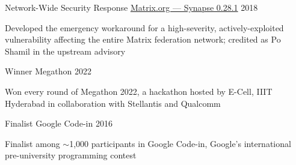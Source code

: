 
\begin{cventries}
  \cventry
    {Network-Wide Security Response} %
    {\href{https://matrix.org/blog/2018/05/01/security-update-synapse-0-28-1/}{Matrix.org --- Synapse 0.28.1}} %
    {} %
    {2018} %
    {
      \begin{cvitems} %
        \item {Developed the emergency workaround for a high-severity, actively-exploited vulnerability affecting the entire Matrix federation network; credited as Po Shamil in the upstream advisory}
      \end{cvitems}
    }

  \cventry
    {Winner} %
    {Megathon} %
    {} %
    {2022} %
    {
      \begin{cvitems} %
        \item {Won every round of Megathon 2022, a hackathon hosted by E-Cell, IIIT Hyderabad in collaboration with Stellantis and Qualcomm}
      \end{cvitems}
    }

  \cventry
    {Finalist} %
    {Google Code-in} %
    {} %
    {2016} %
    {
      \begin{cvitems} %
        \item {Finalist among $\sim$1,000 participants in Google Code-in, Google's international pre-university programming contest}
      \end{cvitems}
    }
\end{cventries}
